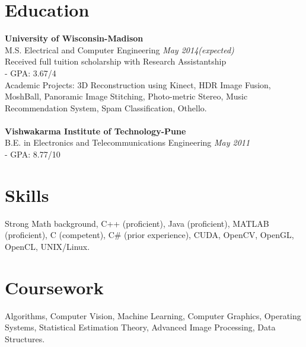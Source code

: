 \documentclass[margin]{res}
\begin{document}
 

 

\address{thite@wisc.edu\\(408) 601-9349\\https://github.com/aashishthite‎}
\address{2110 University Avenue, Apt. 104, \\Madison, WI-53726,\\USA.}

 
\begin{resume} 
 

\section{Education} 
{\bf University of Wisconsin-Madison} \\
M.S. Electrical and Computer Engineering \hfill {\it May 2014(expected)} \\
Received full tuition scholarship with Research Assistantship \\
- GPA: 3.67/4 \\
Academic Projects: 3D Reconstruction using Kinect, HDR Image Fusion, MoshBall, Panoramic Image Stitching, Photo-metric Stereo, Music Recommendation System, Spam Classification, Othello.
\\ \\
{\bf Vishwakarma Institute of Technology-Pune} \\
B.E. in Electronics and Telecommunications Engineering \hfill {\it May 2011} \\
- GPA: 8.77/10
\section{Skills}
Strong Math background, C++ (proficient), Java (proficient), MATLAB (proficient), C (competent), C\# (prior experience), CUDA, OpenCV, OpenGL, OpenCL, UNIX/Linux.

\section{Coursework}
Algorithms, Computer Vision, Machine Learning, Computer Graphics, Operating Systems, Statistical Estimation Theory, Advanced Image Processing, Data Structures.


\end{resume}
\end{document}
